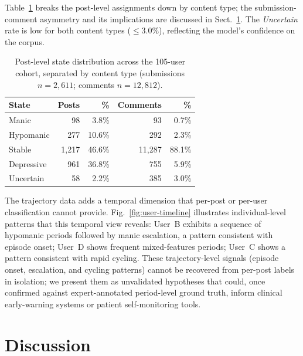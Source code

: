\documentclass[runningheads]{llncs}
\begin{document}
Table~\ref{tab:post-state-dist} breaks the post-level assignments down by content type; the  submission-comment asymmetry and its implications are discussed in Sect.~\ref{sec:discussion}. The \emph{Uncertain} rate is low for both content types ($\leq$3.0\%), reflecting the model's confidence on the corpus.

\begin{table}[t]
\caption{Post-level state distribution across the 105-user cohort, separated by content type (submissions $n = 2{,}611$; comments $n = 12{,}812$).}
\label{tab:post-state-dist}
\centering
\setlength{\tabcolsep}{8pt}
\begin{tabular}{lrrrr}
\toprule
\textbf{State} & \textbf{Posts} & \textbf{\%} & \textbf{Comments} & \textbf{\%} \\
\midrule
Manic & 98 & 3.8\% & 93 & 0.7\% \\
Hypomanic & 277 & 10.6\% & 292 & 2.3\% \\
Stable & 1,217 & 46.6\% & 11,287 & 88.1\% \\
Depressive & 961 & 36.8\% & 755 & 5.9\% \\
Uncertain & 58 & 2.2\% & 385 & 3.0\% \\
\bottomrule
\end{tabular}
\end{table}

The trajectory data adds a temporal dimension that per-post or per-user classification cannot provide. Fig.~\ref{fig:user-timeline} illustrates individual-level patterns that this temporal view reveals: User~B exhibits a sequence of hypomanic periods followed by manic escalation, a pattern consistent with episode onset; User~D shows frequent mixed-features periods; User~C shows a pattern consistent with rapid cycling. These trajectory-level signals (episode onset, escalation, and cycling patterns) cannot be recovered from per-post labels in isolation; we present them as unvalidated hypotheses that could, once confirmed against expert-annotated period-level ground truth, inform clinical early-warning systems or patient self-monitoring tools.

\section{Discussion}
\label{sec:discussion}
\end{document}
